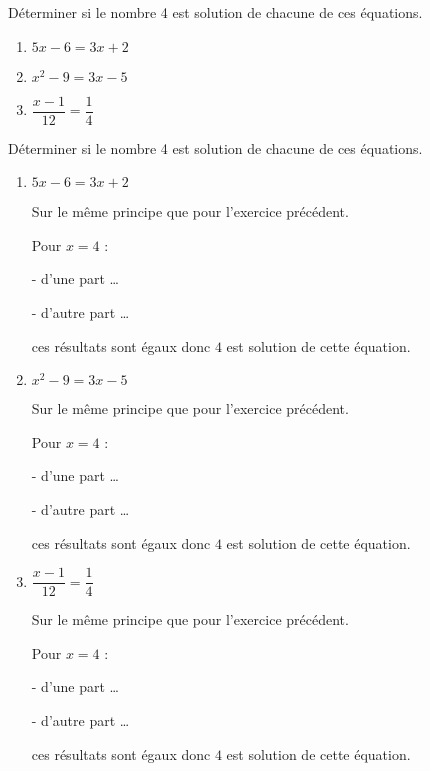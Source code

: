\begin{exercice*}
    Déterminer si le nombre \num{4} est solution de chacune de ces équations.
    \begin{enumerate}
        \item $5x-6=3x+2$
        \item $x^2-9=3x-5$
        \item $\dfrac{x-1}{12}=\dfrac{1}{4}$
    \end{enumerate}
\end{exercice*}
\begin{corrige}
    Déterminer si le nombre \num{4} est solution de chacune de ces équations.
    \begin{enumerate}
        \item $5x-6=3x+2$
        
        {\color{red}Sur le même principe que pour l'exercice précédent.
        
        Pour $x=4$ :
        
        - d'une part \dots
        
        - d'autre part \dots
        
        ces résultats sont égaux donc $4$ est solution de cette équation.
        }
        \item $x^2-9=3x-5$
        
        {\color{red}Sur le même principe que pour l'exercice précédent.
        
        Pour $x=4$ :
        
        - d'une part \dots
        
        - d'autre part \dots
        
        ces résultats sont égaux donc $4$ est solution de cette équation.
        }
        \item $\dfrac{x-1}{12}=\dfrac{1}{4}$
        
        {\color{red}Sur le même principe que pour l'exercice précédent.
        
        Pour $x=4$ :
        
        - d'une part \dots
        
        - d'autre part \dots
        
        ces résultats sont égaux donc $4$ est solution de cette équation.
        }
    \end{enumerate}
\end{corrige}


